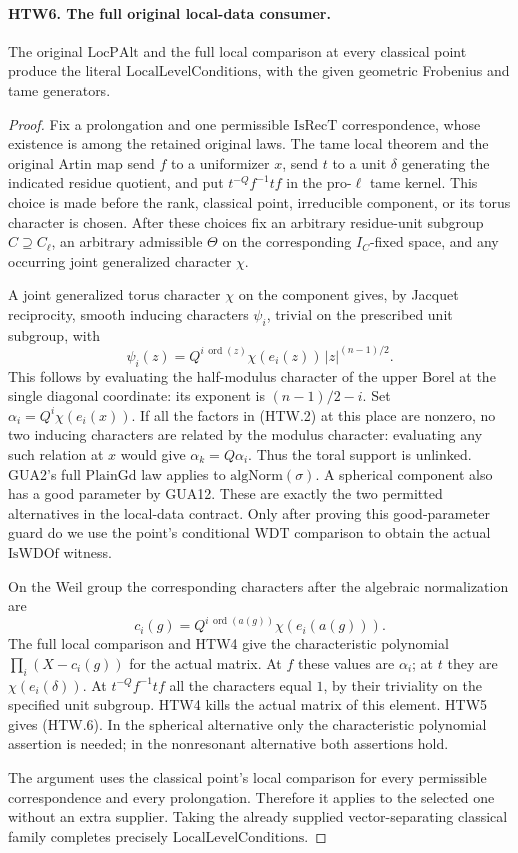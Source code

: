 \documentclass[11pt,a4paper]{article}
\numberwithin{equation}{section}
\theoremstyle{remark}\newtheorem{remark}[theorem]{Remark}
\begin{document}
\paragraph{HTW6. The full original local-data consumer.}
\label{claim:HTW6}
The original \(\mathrm{LocPAlt}\) and the full local comparison
at every classical point produce the literal
\(\mathrm{LocalLevelConditions}\), with the given geometric
Frobenius and tame generators.
\begin{proof}
Fix a prolongation and one permissible \(\mathrm{IsRecT}\)
correspondence, whose existence is among the retained
original laws.  The tame local theorem and the original
Artin map send \(f\) to a uniformizer \(x\), send \(t\)
to a unit \(\delta\) generating the indicated residue
quotient, and put \(t^{-Q}f^{-1}tf\) in the pro-\(\ell\)
tame kernel.  This choice is made before the rank,
classical point, irreducible component, or its torus
character is chosen.  After these choices fix an
arbitrary residue-unit subgroup \(C\supseteq C_\ell\),
an arbitrary admissible \(\Theta\) on the corresponding
\(I_C\)-fixed space, and any occurring joint
generalized character \(\chi\).

A joint generalized torus character \(\chi\) on the
component gives, by Jacquet reciprocity, smooth inducing
characters \(\psi_i\), trivial on the prescribed unit
subgroup, with
\[
 \psi_i(z)=Q^{i\,\operatorname{ord}(z)}
     \chi(e_i(z))\,|z|^{(n-1)/2}.
 \tag{HTW.7}
\]
This follows by evaluating the half-modulus character
of the upper Borel at the single diagonal coordinate:
its exponent is \((n-1)/2-i\).
Set \(\alpha_i=Q^i\chi(e_i(x))\).
If all the factors in (HTW.2) at this place are nonzero,
no two inducing characters are related by the modulus
character: evaluating any such relation at \(x\) would
give \(\alpha_k=Q\alpha_i\).  Thus the toral support is
unlinked.  GUA2's full \(\mathrm{PlainGd}\) law applies
to \(\mathrm{algNorm}(\sigma)\).  A spherical component
also has a good parameter by GUA12.
These are exactly the two permitted alternatives in
the local-data contract.  Only after proving this
good-parameter guard do we use the point's conditional
\(\mathrm{WDT}\) comparison to obtain the actual
\(\mathrm{IsWDOf}\) witness.

On the Weil group the corresponding characters after
the algebraic normalization are
\[
 c_i(g)=Q^{i\,\operatorname{ord}(a(g))}
                         \chi(e_i(a(g))).
 \tag{HTW.8}
\]
The full local comparison and HTW4 give the characteristic
polynomial \(\prod_i(X-c_i(g))\) for the actual matrix.
At \(f\) these values are \(\alpha_i\); at \(t\) they
are \(\chi(e_i(\delta))\).  At \(t^{-Q}f^{-1}tf\)
all the characters equal \(1\), by their triviality
on the specified unit subgroup.  HTW4 kills the actual
matrix of this element.  HTW5 gives (HTW.6).
In the spherical alternative only the characteristic
polynomial assertion is needed; in the nonresonant
alternative both assertions hold.

The argument uses the classical point's local comparison
for every permissible correspondence and every
prolongation.  Therefore it applies to the selected one
without an extra supplier.  Taking the already supplied
vector-separating classical family completes precisely
\(\mathrm{LocalLevelConditions}\).
\end{proof}
\end{document}
